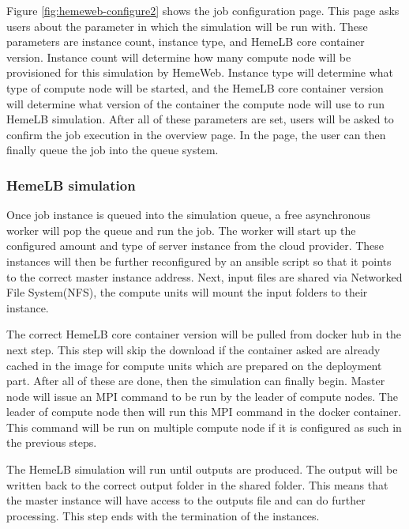 \vspace{1cm}

Figure \ref{fig:hemeweb-configure2} shows the job configuration page. This page asks users about the parameter in which the simulation will be run with. These parameters are instance count, instance type, and HemeLB core container version. Instance count will determine how many compute node will be provisioned for this simulation by HemeWeb. Instance type will determine what type of compute node will be started, and the HemeLB core container version will determine what version of the container the compute node will use to run HemeLB simulation. After all of these parameters are set, users will be asked to confirm the job execution in the overview page. In the page, the user can then finally queue the job into the queue system.



\subsubsection{HemeLB simulation}

Once job instance is queued into the simulation queue, a free asynchronous worker will pop the queue and run the job. The worker will start up the configured amount and type of server instance from the cloud provider. These instances will then be further reconfigured by an ansible script so that it points to the correct master instance address. Next, input files are shared via Networked File System(NFS), the compute units will mount the input folders to their instance. 

The correct HemeLB core container version will be pulled from docker hub in the next step. This step will skip the download if the container asked are already cached in the image for compute units which are prepared on the deployment part. After all of these are done, then the simulation can finally begin. Master node will issue an MPI command to be run by the leader of compute nodes. The leader of compute node then will run this MPI command in the docker container. This command will be run on multiple compute node if it is configured as such in the previous steps. 

The HemeLB simulation will run until outputs are produced. The output will be written back to the correct output folder in the shared folder. This means that the master instance will have access to the outputs file and can do further processing. This step ends with the termination of the instances.

